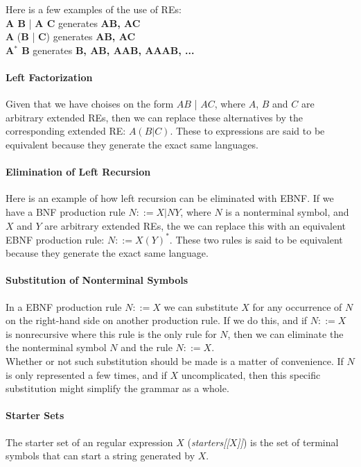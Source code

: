 Here is a few examples of the use of REs: \\
\textbf{A B} | \textbf{A C} generates \textbf{{AB, AC}} \\
\textbf{A} (\textbf{B} | \textbf{C}) generates \textbf{{AB, AC}} \\
\textbf{A$^*$ B} generates \textbf{{B, AB, AAB, AAAB, ...}} \\


\paragraph{Left Factorization}
Given that we have choises on the form $A B$ | $A C$, where $A$, $B$ and $C$ are arbitrary extended REs, then we can replace these alternatives by the corresponding extended RE: $A (B | C)$. These to expressions are said to be equivalent because they generate the exact same languages.

\paragraph{Elimination of Left Recursion}
Here is an example of how left recursion can be eliminated with EBNF. If we have a BNF production rule $N ::= X | N Y$, where $N$ is a nonterminal symbol, and $X$ and $Y$ are arbitrary extended REs, the we can replace this with an equivalent EBNF production rule: $N ::= X (Y)^*$. These two rules is said to be equivalent because they generate the exact same language.

\paragraph{Substitution of Nonterminal Symbols}
In a EBNF production rule $N::=X$ we can substitute $X$ for any occurrence of $N$ on the right-hand side on another production rule. If we do this, and if $N::=X$ is nonrecursive where this rule is the only rule for $N$, then we can eliminate the the nonterminal symbol $N$ and the rule $N::=X$.\\ \indent
Whether or not such substitution should be made is a matter of convenience. If $N$ is only represented a few times, and if $X$ uncomplicated, then this specific substitution might simplify the grammar as a whole.

\paragraph{Starter Sets}
The starter set of an regular expression $X$ (\textit{starters[[$X$]]}) is the set of terminal symbols that can start a string generated by $X$.